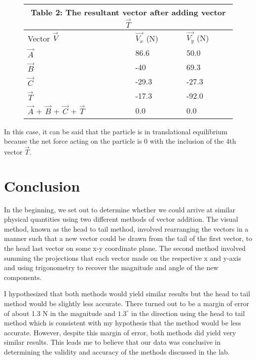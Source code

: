 \documentclass[12pt]{article}
\begin{document}
\begin{figure}[H]
    \centering
    \begin{tabular}{ |p{3cm}|p{3cm}|p{3cm}| }
        \hline
        \multicolumn{3}{|c|}{Table 2: The resultant vector after adding vector $\vec{T}$}              \\
        \hline
        Vector $\vec{V}$                              & $\vec{V_x}$ (N) & $\vec{V_y}$ (N) \\
        \hline
        $\vec{A}$                                     & 86.6            & 50.0            \\
        $\vec{B}$                                     & -40             & 69.3            \\
        $\vec{C}$                                     & -29.3           & -27.3           \\
        $\vec{T}$                                     & -17.3           & -92.0           \\
        \hline
        $\vec{A}$ + $\vec{B}$ + $\vec{C}$ + $\vec{T}$ & 0.0             & 0.0             \\
        \hline
    \end{tabular}
\end{figure}

In this case, it can be said that the particle is in translational equilibrium because the net force acting on the particle is 0 with the inclusion of the 4th vector $\vec{T}$.
\section{Conclusion}
In the beginning, we set out to determine whether we could arrive at similar physical quantities using two different methods of vector addition. The visual method, known as the head to tail method, involved rearranging the vectors in a manner such that a new vector could be drawn from the tail of the first vector, to the head last vector on some x-y coordinate plane. The second method involved summing the projections that each vector made on the respective x and y-axis and using trigonometry to recover the magnitude and angle of the new components.

I hypothesized that both methods would yield similar results but the head to tail method would be slightly less accurate. There turned out to be a margin of error of about 1.3 N in the magnitude and $1.3^\circ$ in the direction using the head to tail method which is consistent with my hypothesis that the method would be less accurate. However, despite this margin of error, both methods did yield very similar results. This leads me to believe that our data was conclusive in determining the validity and accuracy of the methods discussed in the lab.
\end{document}
